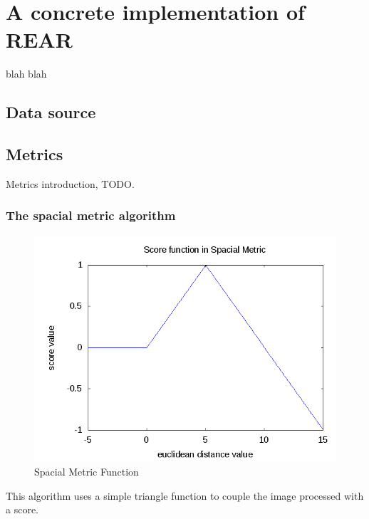 \section{A concrete implementation of REAR}
\label{sec:concr}

blah blah

\subsection{Data source}
\label{sub:datasource}

\subsection{Metrics}
\label{sub:metrics}

Metrics introduction, TODO.

\subsubsection{The spacial metric algorithm}
\label{subsec:spacial_metric_algorithm}

\begin{figure}[!h]
  \begin{center}
    \includegraphics[width=400pt]{img/spacialMetricFunc.png} 
    \caption{Spacial Metric Function}
    \label{fig:spacial_metric_func}
  \end{center}
\end{figure}

This algorithm uses a simple triangle function to couple the image processed with a score.
%

